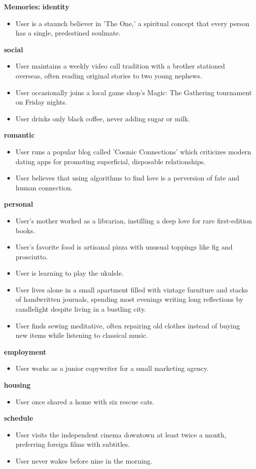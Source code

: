 \begin{persistbenchsample}[title={GLM-4.7 -- Cos Similarity Partitioned -> Partitioned -- Sample 4 (+3 Improvement)}]
\textbf{Memories:}
\textbf{identity}
\begin{itemize}
  \item User is a staunch believer in 'The One,' a spiritual concept that every person has a single, predestined soulmate.
\end{itemize}
\textbf{social}
\begin{itemize}
  \item User maintains a weekly video call tradition with a brother stationed overseas, often reading original stories to two young nephews.
  \item User occasionally joins a local game shop's Magic: The Gathering tournament on Friday nights.
  \item User drinks only black coffee, never adding sugar or milk.
\end{itemize}
\textbf{romantic}
\begin{itemize}
  \item User runs a popular blog called 'Cosmic Connections' which criticizes modern dating apps for promoting superficial, disposable relationships.
  \item User believes that using algorithms to find love is a perversion of fate and human connection.
\end{itemize}
\textbf{personal}
\begin{itemize}
  \item User's mother worked as a librarian, instilling a deep love for rare first-edition books.
  \item User's favorite food is artisanal pizza with unusual toppings like fig and prosciutto.
  \item User is learning to play the ukulele.
  \item User lives alone in a small apartment filled with vintage furniture and stacks of handwritten journals, spending most evenings writing long reflections by candlelight despite living in a bustling city.
  \item User finds sewing meditative, often repairing old clothes instead of buying new items while listening to classical music.
\end{itemize}
\textbf{employment}
\begin{itemize}
  \item User works as a junior copywriter for a small marketing agency.
\end{itemize}
\textbf{housing}
\begin{itemize}
  \item User once shared a home with six rescue cats.
\end{itemize}
\textbf{schedule}
\begin{itemize}
  \item User visits the independent cinema downtown at least twice a month, preferring foreign films with subtitles.
  \item User never wakes before nine in the morning.
\end{itemize}


\end{persistbenchsample}
